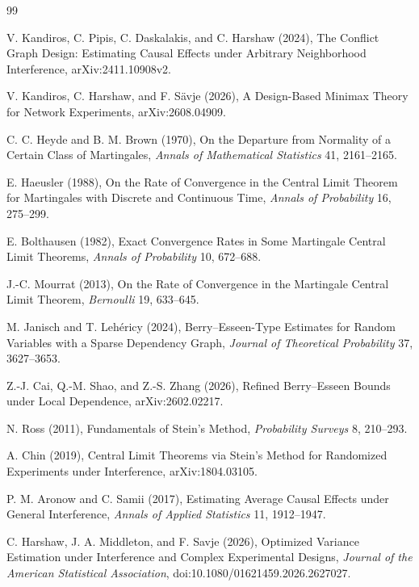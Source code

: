 \documentclass{article}
\begin{document}
\begin{thebibliography}{99}

   V. Kandiros, C. Pipis, C. Daskalakis, and C. Harshaw (2024), The Conflict Graph Design: Estimating Causal Effects under Arbitrary Neighborhood Interference, arXiv:2411.10908v2.

   V. Kandiros, C. Harshaw, and F. S\"{a}vje (2026), A Design-Based Minimax Theory for Network Experiments, arXiv:2608.04909.

   C. C. Heyde and B. M. Brown (1970), On the Departure from Normality of a Certain Class of Martingales, \emph{Annals of Mathematical Statistics} 41, 2161--2165.

   E. Haeusler (1988), On the Rate of Convergence in the Central Limit Theorem for Martingales with Discrete and Continuous Time, \emph{Annals of Probability} 16, 275--299.

   E. Bolthausen (1982), Exact Convergence Rates in Some Martingale Central Limit Theorems, \emph{Annals of Probability} 10, 672--688.

   J.-C. Mourrat (2013), On the Rate of Convergence in the Martingale Central Limit Theorem, \emph{Bernoulli} 19, 633--645.

   M. Janisch and T. Leh\'{e}ricy (2024), Berry--Esseen-Type Estimates for Random Variables with a Sparse Dependency Graph, \emph{Journal of Theoretical Probability} 37, 3627--3653.

   Z.-J. Cai, Q.-M. Shao, and Z.-S. Zhang (2026), Refined Berry--Esseen Bounds under Local Dependence, arXiv:2602.02217.

   N. Ross (2011), Fundamentals of Stein's Method, \emph{Probability Surveys} 8, 210--293.

   A. Chin (2019), Central Limit Theorems via Stein's Method for Randomized Experiments under Interference, arXiv:1804.03105.

   P. M. Aronow and C. Samii (2017), Estimating Average Causal Effects under General Interference, \emph{Annals of Applied Statistics} 11, 1912--1947.

   C. Harshaw, J. A. Middleton, and F. Savje (2026), Optimized Variance Estimation under Interference and Complex Experimental Designs, \emph{Journal of the American Statistical Association}, doi:10.1080/01621459.2026.2627027.


\end{thebibliography}
\end{document}
